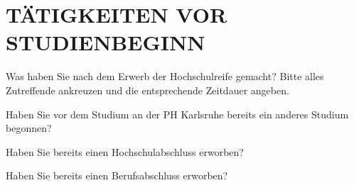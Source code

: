 
\section{\uppercase{Tätigkeiten vor Studienbeginn}}
\vspace{.25cm}

\begin{choicegroup}{Was haben Sie nach dem Erwerb der Hochschulreife gemacht? \newline \footnotesize{Bitte alles Zutreffende ankreuzen und die entsprechende Zeitdauer angeben.}}
	\groupaddchoice{}


\end{choicegroup}

\vspace{-.15cm}
\separate
\vspace{-.15cm}

\begin{choicequestion}[1]{Haben Sie vor dem Studium an der PH Karlsruhe bereits ein anderes Studium begonnen?}
\end{choicequestion}

\vspace{-.15cm}
\separate
\vspace{-.15cm}

\begin{choicequestion}[1]{Haben Sie bereits einen Hochschulabschluss erworben?}
\end{choicequestion}

\vspace{-.15cm}
\separate
\vspace{-.15cm}

\begin{choicequestion}[1]{Haben Sie bereits einen Berufsabschluss erworben?}
\end{choicequestion}
